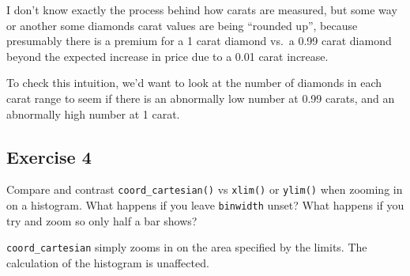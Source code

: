 \documentclass[]{book}
\newenvironment{Shaded}{\begin{snugshade}}{\end{snugshade}}
\newcommand{\CommentTok}[1]{\textcolor[rgb]{0.56,0.35,0.01}{\textit{#1}}}
\newcommand{\DataTypeTok}[1]{\textcolor[rgb]{0.13,0.29,0.53}{#1}}
\newcommand{\DecValTok}[1]{\textcolor[rgb]{0.00,0.00,0.81}{#1}}
\newcommand{\FloatTok}[1]{\textcolor[rgb]{0.00,0.00,0.81}{#1}}
\newcommand{\KeywordTok}[1]{\textcolor[rgb]{0.13,0.29,0.53}{\textbf{#1}}}
\newcommand{\NormalTok}[1]{#1}
\newcommand{\OperatorTok}[1]{\textcolor[rgb]{0.81,0.36,0.00}{\textbf{#1}}}
\newcommand{\StringTok}[1]{\textcolor[rgb]{0.31,0.60,0.02}{#1}}
\theoremstyle{plain}
\theoremstyle{remark}
\theoremstyle{definition}
\theoremstyle{definition}
\theoremstyle{definition}
\theoremstyle{remark}
\begin{document}
I don't know exactly the process behind how carats are measured, but
some way or another some diamonds carat values are being ``rounded up'',
because presumably there is a premium for a 1 carat diamond vs.~a 0.99
carat diamond beyond the expected increase in price due to a 0.01 carat
increase.

To check this intuition, we'd want to look at the number of diamonds in
each carat range to seem if there is an abnormally low number at 0.99
carats, and an abnormally high number at 1 carat.

\begin{Shaded}
\end{Shaded}

\hypertarget{exercise-4-9}{%
\subsection{Exercise 4}\label{exercise-4-9}}

Compare and contrast \texttt{coord\_cartesian()} vs \texttt{xlim()} or
\texttt{ylim()} when zooming in on a histogram. What happens if you
leave \texttt{binwidth} unset? What happens if you try and zoom so only
half a bar shows?

\texttt{coord\_cartesian} simply zooms in on the area specified by the
limits. The calculation of the histogram is unaffected.
\end{document}
